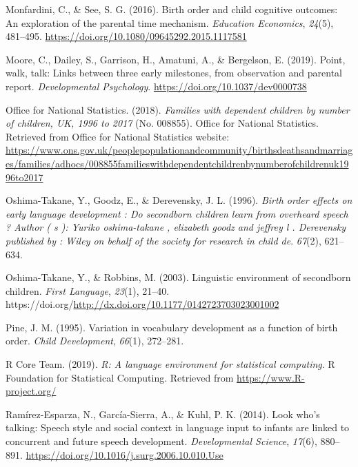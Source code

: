 \documentclass[
  english,
  man,floatsintext]{apa6}
\newlength{\cslhangindent}
\newenvironment{CSLReferences}[2] %
 {%
  \setlength{\parindent}{0pt}
  \ifodd #1 \everypar{\setlength{\hangindent}{\cslhangindent}}\ignorespaces\fi
  \ifnum #2 > 0
  \setlength{\parskip}{#2\baselineskip}
  \fi
 }%
 {}
\begin{document}
\begin{CSLReferences}{1}{0}
\leavevmode{}%
Monfardini, C., \& See, S. G. (2016). Birth order and child cognitive outcomes: An exploration of the parental time mechanism. \emph{Education Economics}, \emph{24}(5), 481--495. \url{https://doi.org/10.1080/09645292.2015.1117581}

\leavevmode{}%
Moore, C., Dailey, S., Garrison, H., Amatuni, A., \& Bergelson, E. (2019). Point, walk, talk: Links between three early milestones, from observation and parental report. \emph{Developmental Psychology}. \url{https://doi.org/10.1037/dev0000738}

\leavevmode{}%
Office for National Statistics. (2018). \emph{Families with dependent children by number of children, {UK}, 1996 to 2017} (No. 008855). Office for National Statistics. Retrieved from Office for National Statistics website: \url{https://www.ons.gov.uk/peoplepopulationandcommunity/birthsdeathsandmarriages/families/adhocs/008855familieswithdependentchildrenbynumberofchildrenuk1996to2017}

\leavevmode{}%
Oshima-Takane, Y., Goodz, E., \& Derevensky, J. L. (1996). \emph{Birth order effects on early language development : Do secondborn children learn from overheard speech ? Author ( s ): Yuriko oshima-takane , elizabeth goodz and jeffrey l . Derevensky published by : Wiley on behalf of the society for research in child de}. \emph{67}(2), 621--634.

\leavevmode{}%
Oshima-Takane, Y., \& Robbins, M. (2003). Linguistic environment of secondborn children. \emph{First Language}, \emph{23}(1), 21--40. https://doi.org/\url{http://dx.doi.org/10.1177/0142723703023001002}

\leavevmode{}%
Pine, J. M. (1995). Variation in vocabulary development as a function of birth order. \emph{Child Development}, \emph{66}(1), 272--281.

\leavevmode{}%
R Core Team. (2019). \emph{R: A language environment for statistical computing}. R Foundation for Statistical Computing. Retrieved from \url{https://www.R-project.org/}

\leavevmode{}%
Ramírez-Esparza, N., García-Sierra, A., \& Kuhl, P. K. (2014). Look who's talking: Speech style and social context in language input to infants are linked to concurrent and future speech development. \emph{Developmental Science}, \emph{17}(6), 880--891. \url{https://doi.org/10.1016/j.surg.2006.10.010.Use}


\end{CSLReferences}
\end{document}

